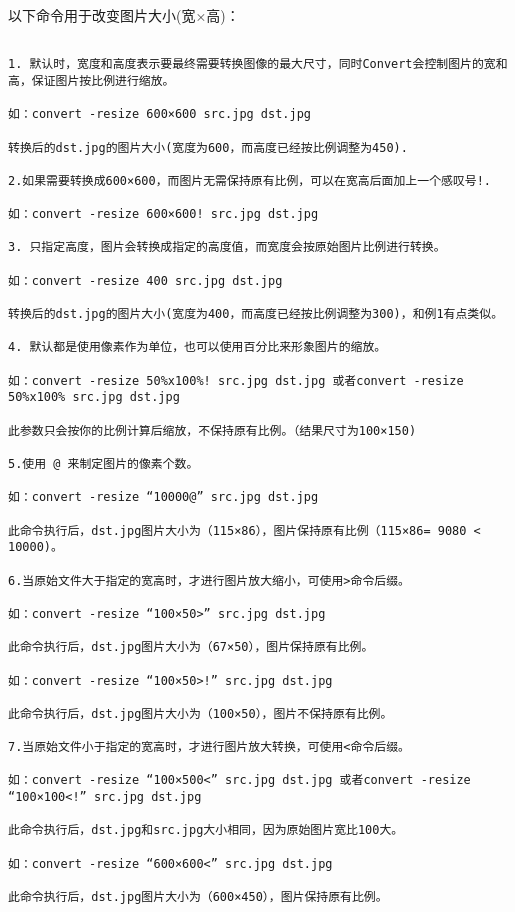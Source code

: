 以下命令用于改变图片大小(宽×高)：
\begin{verbatim}

1. 默认时，宽度和高度表示要最终需要转换图像的最大尺寸，同时Convert会控制图片的宽和高，保证图片按比例进行缩放。

如：convert -resize 600×600 src.jpg dst.jpg

转换后的dst.jpg的图片大小(宽度为600，而高度已经按比例调整为450).

2.如果需要转换成600×600，而图片无需保持原有比例，可以在宽高后面加上一个感叹号!.

如：convert -resize 600×600! src.jpg dst.jpg

3. 只指定高度，图片会转换成指定的高度值，而宽度会按原始图片比例进行转换。

如：convert -resize 400 src.jpg dst.jpg

转换后的dst.jpg的图片大小(宽度为400，而高度已经按比例调整为300)，和例1有点类似。

4. 默认都是使用像素作为单位，也可以使用百分比来形象图片的缩放。

如：convert -resize 50%x100%! src.jpg dst.jpg 或者convert -resize 50%x100% src.jpg dst.jpg

此参数只会按你的比例计算后缩放，不保持原有比例。（结果尺寸为100×150)

5.使用 @ 来制定图片的像素个数。

如：convert -resize “10000@” src.jpg dst.jpg

此命令执行后，dst.jpg图片大小为（115×86），图片保持原有比例（115×86= 9080 < 10000)。

6.当原始文件大于指定的宽高时，才进行图片放大缩小，可使用>命令后缀。

如：convert -resize “100×50>” src.jpg dst.jpg

此命令执行后，dst.jpg图片大小为（67×50），图片保持原有比例。

如：convert -resize “100×50>!” src.jpg dst.jpg

此命令执行后，dst.jpg图片大小为（100×50），图片不保持原有比例。

7.当原始文件小于指定的宽高时，才进行图片放大转换，可使用<命令后缀。

如：convert -resize “100×500<” src.jpg dst.jpg 或者convert -resize “100×100<!” src.jpg dst.jpg

此命令执行后，dst.jpg和src.jpg大小相同，因为原始图片宽比100大。

如：convert -resize “600×600<” src.jpg dst.jpg

此命令执行后，dst.jpg图片大小为（600×450），图片保持原有比例。


\end{verbatim}
